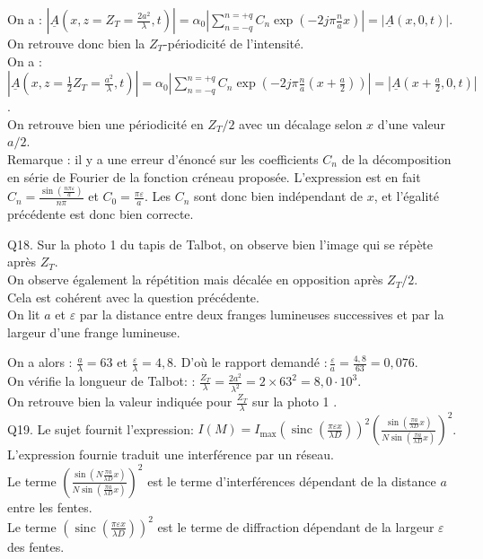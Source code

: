 \documentclass[10pt]{article}
\begin{document}
On a : \(\left|\underline{A}\left(x, z=Z_{T}=\frac{2 a^{2}}{\lambda}, t\right)\right|=\alpha_{0}\left|\sum_{n=-q}^{n=+q} C_{n} \exp \left(-2 j \pi \frac{n}{a} x\right)\right|=|\underline{A}(x, 0, t)|\).\\
On retrouve donc bien la \(Z_{T}\)-périodicité de l'intensité.\\
On a : \(\left|\underline{A}\left(x, z=\frac{1}{2} Z_{T}=\frac{a^{2}}{\lambda}, t\right)\right|=\alpha_{0}\left|\sum_{n=-q}^{n=+q} C_{n} \exp \left(-2 j \pi \frac{n}{a}\left(x+\frac{a}{2}\right)\right)\right|=\left|\underline{A}\left(x+\frac{a}{2}, 0, t\right)\right|\).\\
On retrouve bien une périodicité en \(Z_{T} / 2\) avec un décalage selon \(x\) d'une valeur \(a / 2\).\\
Remarque : il y a une erreur d'énoncé sur les coefficients \(C_{n}\) de la décomposition en série de Fourier de la fonction créneau proposée. L'expression est en fait \(C_{n}=\frac{\sin \left(\frac{n \pi \varepsilon}{a}\right)}{n \pi}\) et \(C_{0}=\frac{\pi \varepsilon}{a}\). Les \(C_{n}\) sont donc bien indépendant de \(x\), et l'égalité précédente est donc bien correcte.

Q18. Sur la photo 1 du tapis de Talbot, on observe bien l'image qui se répète après \(Z_{T}\).\\
On observe également la répétition mais décalée en opposition après \(Z_{T} / 2\).\\
Cela est cohérent avec la question précédente.\\
On lit \(a\) et \(\varepsilon\) par la distance entre deux franges lumineuses successives et par la largeur d'une frange lumineuse.

On a alors : \(\frac{a}{\lambda}=63\) et \(\frac{\varepsilon}{\lambda}=4,8\). D'où le rapport demandé \(: \frac{\varepsilon}{a}=\frac{4,8}{63}=0,076\).\\
On vérifie la longueur de Talbot: : \(\frac{Z_{T}}{\lambda}=\frac{2 a^{2}}{\lambda^{2}}=2 \times 63^{2}=8,0 \cdot 10^{3}\).\\
On retrouve bien la valeur indiquée pour \(\frac{Z_{T}}{\lambda}\) sur la photo 1 .\\
Q19. Le sujet fournit l'expression: \(I(M)=I_{\max }\left(\operatorname{sinc}\left(\frac{\pi \varepsilon x}{\lambda D}\right)\right)^{2}\left(\frac{\sin \left(\frac{\pi a}{\lambda D} x\right)}{N \sin \left(\frac{\pi a}{\lambda D} x\right)}\right)^{2}\).\\
L'expression fournie traduit une interférence par un réseau.\\
Le terme \(\left(\frac{\sin \left(N \frac{\pi a}{\lambda D} x\right)}{N \sin \left(\frac{\pi a}{\lambda D} x\right)}\right)^{2}\) est le terme d'interférences dépendant de la distance \(a\) entre les fentes.\\
Le terme \(\left(\operatorname{sinc}\left(\frac{\pi \varepsilon x}{\lambda D}\right)\right)^{2}\) est le terme de diffraction dépendant de la largeur \(\varepsilon\) des fentes.
\end{document}
